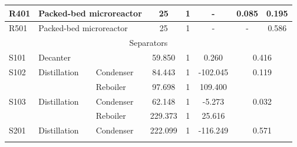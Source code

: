 \begin{table}[h]
{\begin{tabular}{|l|l|l|c|c|c|c|c|c|c|}
R401                                       & \multicolumn{2}{l|}{Packed-bed microreactor}          & \multicolumn{2}{c|}{25}               & 1                               & \multicolumn{2}{c|}{-}              & 0.085                  & 0.195              \\ \hline
R501                                       & \multicolumn{2}{l|}{Packed-bed microreactor}          & \multicolumn{2}{c|}{25}               & 1                               & \multicolumn{2}{c|}{-}              & -                      & 0.586              \\ \hline
\multicolumn{10}{|c|}{Separators}                                                                                                                                                                                                                                \\ \hline
S101                                       & \multicolumn{2}{l|}{Decanter}                         & \multicolumn{2}{c|}{59.850}           & 1                               & \multicolumn{2}{c|}{0.260}          & \multicolumn{2}{c|}{0.416}                  \\ \hline
\multirow{2}{*}{S102}                      & \multirow{2}{*}{Distillation}        & Condenser      & \multicolumn{2}{c|}{84.443}           & 1                               & \multicolumn{2}{c|}{-102.045}       & \multicolumn{2}{c|}{\multirow{2}{*}{0.119}} \\ \cline{3-8}
                                           &                                      & Reboiler       & \multicolumn{2}{c|}{97.698}           & 1                               & \multicolumn{2}{c|}{109.400}        & \multicolumn{2}{c|}{}                       \\ \hline
\multirow{2}{*}{S103}                      & \multirow{2}{*}{Distillation}        & Condenser      & \multicolumn{2}{c|}{62.148}           & 1                               & \multicolumn{2}{c|}{-5.273}         & \multicolumn{2}{c|}{\multirow{2}{*}{0.032}} \\ \cline{3-8}
                                           &                                      & Reboiler       & \multicolumn{2}{c|}{229.373}          & 1                               & \multicolumn{2}{c|}{25.616}         & \multicolumn{2}{c|}{}                       \\ \hline
\multirow{2}{*}{S201}                      & \multirow{2}{*}{Distillation}        & Condenser      & \multicolumn{2}{c|}{222.099}          & 1                               & \multicolumn{2}{c|}{-116.249}       & \multicolumn{2}{c|}{\multirow{2}{*}{0.571}} \\ \cline{3-8}

\end{tabular}}
\end{table}
